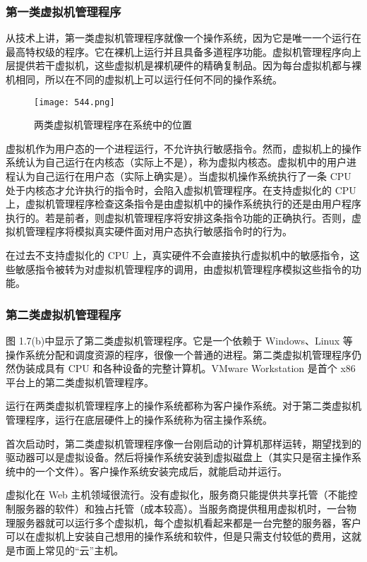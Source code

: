 \documentclass{ctexbook}
\begin{document}
		\subsubsection{第一类虚拟机管理程序}
		从技术上讲，第一类虚拟机管理程序就像一个操作系统，因为它是唯一一个运行在最高特权级的程序。它在裸机上运行并且具备多道程序功能。虚拟机管理程序向上层提供若干虚拟机，这些虚拟机是裸机硬件的精确复制品。因为每台虚拟机都与裸机相同，所以在不同的虚拟机上可以运行任何不同的操作系统。
		
		
		\begin{figure}[h]
			\centering
			\centering
			\label{fig:tttt}
			\texttt{[image: 544.png]}
			\caption{两类虚拟机管理程序在系统中的位置}
		\end{figure}
		
		虚拟机作为用户态的一个进程运行，不允许执行敏感指令。然而，虚拟机上的操作系统认为自己运行在内核态（实际上不是），称为虚拟内核态。虚拟机中的用户进程认为自己运行在用户态（实际上确实是）。当虚拟机操作系统执行了一条 CPU 处于内核态才允许执行的指令时，会陷入虚拟机管理程序。在支持虚拟化的 CPU 上，虚拟机管理程序检查这条指令是由虚拟机中的操作系统执行的还是由用户程序执行的。若是前者，则虚拟机管理程序将安排这条指令功能的正确执行。否则，虚拟机管理程序将模拟真实硬件面对用户态执行敏感指令时的行为。
		
		在过去不支持虚拟化的 CPU 上，真实硬件不会直接执行虚拟机中的敏感指令，这些敏感指令被转为对虚拟机管理程序的调用，由虚拟机管理程序模拟这些指令的功能。
		
		\subsubsection{第二类虚拟机管理程序}
		图 1.7(b)中显示了第二类虚拟机管理程序。它是一个依赖于 Windows、Linux 等操作系统分配和调度资源的程序，很像一个普通的进程。第二类虚拟机管理程序仍然伪装成具有 CPU 和各种设备的完整计算机。VMware Workstation 是首个 x86 平台上的第二类虚拟机管理程序。
		
		运行在两类虚拟机管理程序上的操作系统都称为客户操作系统。对于第二类虚拟机管理程序，运行在底层硬件上的操作系统称为宿主操作系统。
		
		首次启动时，第二类虚拟机管理程序像一台刚启动的计算机那样运转，期望找到的驱动器可以是虚拟设备。然后将操作系统安装到虚拟磁盘上（其实只是宿主操作系统中的一个文件）。客户操作系统安装完成后，就能启动并运行。
		
		虚拟化在 Web 主机领域很流行。没有虚拟化，服务商只能提供共享托管（不能控制服务器的软件）和独占托管（成本较高）。当服务商提供租用虚拟机时，一台物理服务器就可以运行多个虚拟机，每个虚拟机看起来都是一台完整的服务器，客户可以在虚拟机上安装自己想用的操作系统和软件，但是只需支付较低的费用，这就是市面上常见的“云”主机。
		
\end{document}
